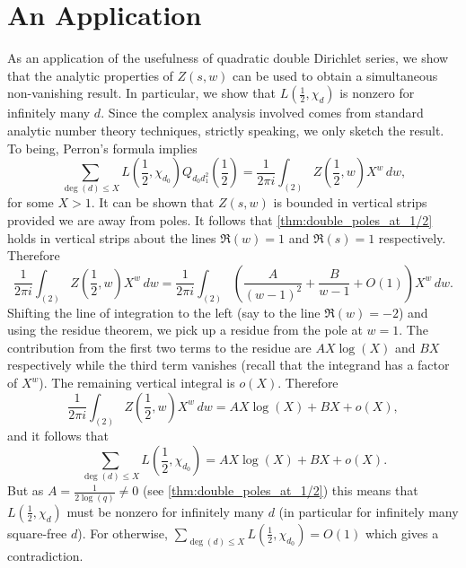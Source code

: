 \documentclass[12pt,reqno,oneside]{amsart}
\begin{document}
\section*{An Application}
    As an application of the usefulness of quadratic double Dirichlet series, we show that the analytic properties of $Z(s,w)$ can be used to obtain a simultaneous non-vanishing result. In particular, we show that $L\left(\frac{1}{2},\chi_{d}\right)$ is nonzero for infinitely many $d$. Since the complex analysis involved comes from standard analytic number theory techniques, strictly speaking, we only sketch the result. To being, Perron's formula implies
    \[
        \sum_{\deg(d) \le X}L\left(\frac{1}{2},\chi_{d_{0}}\right)Q_{d_{0}d_{1}^{2}}\left(\frac{1}{2}\right) = \frac{1}{2\pi i}\int_{(2)}Z\left(\frac{1}{2},w\right)X^{w}\,dw,
    \]
    for some $X > 1$. It can be shown that $Z(s,w)$ is bounded in vertical strips provided we are away from poles. It follows that \cref{thm:double_poles_at_1/2} holds in vertical strips about the lines $\Re(w) = 1$ and $\Re(s) = 1$ respectively. Therefore
    \[
        \frac{1}{2\pi i}\int_{(2)}Z\left(\frac{1}{2},w\right)X^{w}\,dw = \frac{1}{2\pi i}\int_{(2)}\left(\frac{A}{(w-1)^{2}}+\frac{B}{w-1}+O(1)\right)X^{w}\,dw.
    \]
    Shifting the line of integration to the left (say to the line $\Re(w) = -2$) and using the residue theorem, we pick up a residue from the pole at $w = 1$. The contribution from the first two terms to the residue are $AX\log(X)$ and $BX$ respectively while the third term vanishes (recall that the integrand has a factor of $X^{w}$). The remaining vertical integral is $o(X)$. Therefore
    \[
        \frac{1}{2\pi i}\int_{(2)}Z\left(\frac{1}{2},w\right)X^{w}\,dw = AX\log(X)+BX+o(X),
    \]
    and it follows that
    \[
        \sum_{\deg(d) \le X}L\left(\frac{1}{2},\chi_{d_{0}}\right) = AX\log(X)+BX+o(X).
    \]
    But as $A = \frac{1}{2\log(q)} \neq 0$ (see \cref{thm:double_poles_at_1/2}) this means that $L\left(\frac{1}{2},\chi_{d}\right)$ must be nonzero for infinitely many $d$ (in particular for infinitely many square-free $d$). For otherwise, $\sum_{\deg(d) \le X}L\left(\frac{1}{2},\chi_{d_{0}}\right) = O(1)$ which gives a contradiction.
\end{document}
